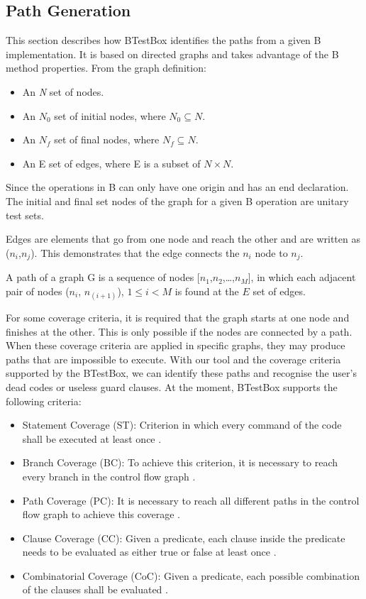 \documentclass[runningheads]{llncs}
\begin{document}
\subsection{Path Generation}

This section describes how BTestBox identifies the paths from a given B implementation. It is based on directed graphs and takes advantage of the B method properties. From the graph definition:

\begin{itemize}
    \item An \textit{N} set of nodes.
    \item An $N_0$ set of initial nodes, where $N_0 \subseteq N$.
    \item An $N_f$ set of final nodes, where $N_f \subseteq N$.
    \item An E set of edges, where E is a subset of $N \times N$.
\end{itemize}

Since the operations in B can only have one origin and has an end declaration. The initial and final set nodes of the graph for a given B operation are unitary test sets.

Edges are elements that go from one node and reach the other and are written as ($n_i$,$n_j$). This demonstrates that the edge connects the $n_i$ node to $n_j$.

A path of a graph G is a sequence of nodes [$n_1$,$n_2$,\ldots,$n_M$], in which each adjacent pair of nodes ($n_i$, $n_{(i+1)}$), $1 \leq i < M$ is found at the $E$ set of edges.

For some coverage criteria, it is required that the graph starts at one node and finishes at the other. This is only possible if the nodes are connected by a path. When these coverage criteria are applied in specific graphs, they may produce paths that are impossible to execute. With our tool and the coverage criteria supported by the BTestBox, we can identify these paths and recognise the user's dead codes or useless guard clauses. At the moment, BTestBox supports the following criteria:

\begin{itemize}
    \item Statement Coverage (ST): Criterion in which every command of the code shall be executed at least once \cite{ammann2008introduction}.
    \item Branch Coverage (BC): To achieve this criterion, it is necessary to reach every branch in the control flow graph \cite{ammann2008introduction}.
    \item Path Coverage (PC): It is necessary to reach all different paths in the control flow graph to achieve this coverage \cite{ammann2008introduction}.
    \item Clause Coverage (CC): Given a predicate, each clause inside the predicate needs to be evaluated as either true or false at least once \cite{ammann2003coverage}.
    \item Combinatorial Coverage (CoC): Given a predicate, each possible combination of the clauses shall be evaluated \cite{ammann2003coverage}.
\end{itemize}
\end{document}
